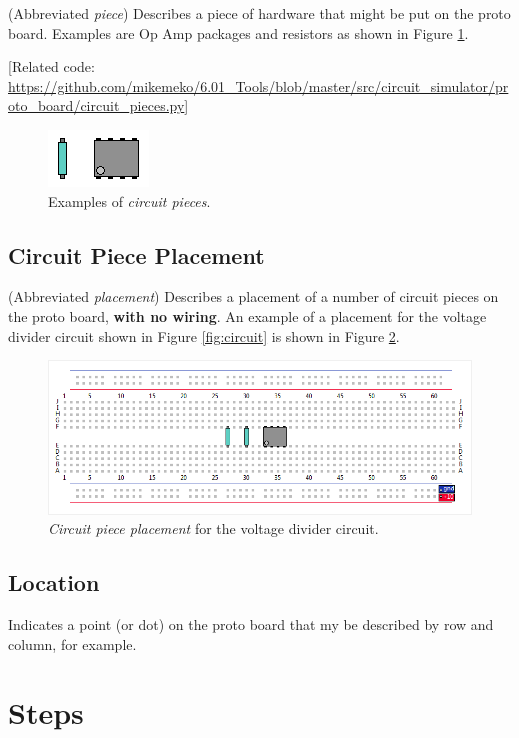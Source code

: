 \documentclass[12pt]{amsart}
\begin{document}
(Abbreviated \emph{piece}) Describes a piece of hardware that might be put on the proto board. Examples are Op Amp packages and resistors as shown in Figure \ref{fig:pieces}.

[Related code: \url{https://github.com/mikemeko/6.01_Tools/blob/master/src/circuit_simulator/proto_board/circuit_pieces.py}]

\begin{figure}
\includegraphics{Images/Circuit_Pieces.png}
\caption{Examples of \emph{circuit pieces}.}
\label{fig:pieces}
\end{figure}

\subsection{Circuit Piece Placement}

(Abbreviated \emph{placement}) Describes a placement of a number of circuit pieces on the proto board, \textbf{with no wiring}. An example of a placement for the voltage divider circuit shown in Figure \ref{fig:circuit} is shown in Figure \ref{fig:placement}.

\begin{figure}
\includegraphics[width=\linewidth]{Images/Circuit_Piece_Placement.png}
\caption{\emph{Circuit piece placement} for the voltage divider circuit.}
\label{fig:placement}
\end{figure}

\subsection{Location} Indicates a point (or dot) on the proto board that my be described by row and column, for example.

\section{Steps}
\end{document}
